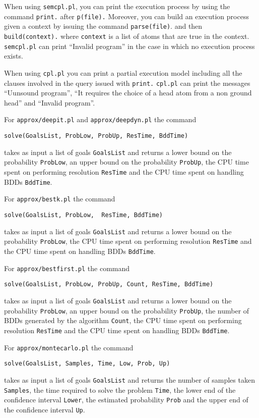 \documentclass[a4paper,10pt]{article}
\begin{document}
When using \texttt{semcpl.pl}, you can print the execution process by using the command \texttt{print.}
after \texttt{p(file).} Moreover, you can build an execution process given a context by issuing the command \texttt{parse(file)}. and then
\texttt{build(context).} where \texttt{context} is a list of atoms that are true in the context.
\texttt{semcpl.pl}  can print ``Invalid program'' in the case in which no execution process exists. 

When using \texttt{cpl.pl} you can print a partial execution model including all the clauses involved in the query issued with \texttt{print.} \texttt{cpl.pl} can print the messages ``Uunsound program'', ``It requires the choice of a head atom from a non ground head'' and ``Invalid program''.

For \texttt{approx/deepit.pl} and \texttt{approx/deepdyn.pl} the command 
\begin{verbatim}
solve(GoalsList, ProbLow, ProbUp, ResTime, BddTime)
\end{verbatim}
takes as input a list of goals \texttt{GoalsList} and returns a lower bound on the probability \texttt{ProbLow}, an upper bound on the probability \texttt{ProbUp}, the CPU time spent on performing resolution \texttt{ResTime} and the CPU time spent on handling BDDs \texttt{BddTime}.

For \texttt{approx/bestk.pl} the command 
\begin{verbatim}
solve(GoalsList, ProbLow,  ResTime, BddTime)
\end{verbatim}
takes as input a list of goals \texttt{GoalsList} and returns a lower bound on the probability \texttt{ProbLow}, the CPU time spent on performing resolution \texttt{ResTime} and the CPU time spent on handling BDDs \texttt{BddTime}.

For \texttt{approx/bestfirst.pl}  the command 
\begin{verbatim}
solve(GoalsList, ProbLow, ProbUp, Count, ResTime, BddTime)
\end{verbatim}
takes as input a list of goals \texttt{GoalsList} and returns a lower bound on the probability \texttt{ProbLow}, an upper bound on the probability \texttt{ProbUp}, the number of BDDs generated by the algorithm \texttt{Count}, the CPU time spent on performing resolution \texttt{ResTime} and the CPU time spent on handling BDDs \texttt{BddTime}.


For \texttt{approx/montecarlo.pl} 
the command 
\begin{verbatim}
solve(GoalsList, Samples, Time, Low, Prob, Up)
\end{verbatim}
takes as input a list of goals \texttt{GoalsList} and returns the number of samples taken \texttt{Samples}, 
the time required to solve the problem \texttt{Time}, the
lower end of the confidence interval \texttt{Lower}, the estimated probability \texttt{Prob} and the upper end of the confidence interval \texttt{Up}.
\end{document}
